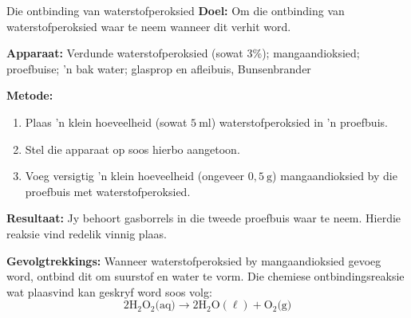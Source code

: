 \par
\label{m38709*secfhsst!!!underscore!!!id163}
            \begin{g_experiment}{Die ontbinding van waterstofperoksied}
            \nopagebreak
            \label{m38709*id63175}\noindent{}\textbf{Doel:}\newline
    Om die ontbinding van waterstofperoksied waar te neem wanneer dit verhit word. \par 
        \label{m38709*id63194}\noindent{}\textbf{Apparaat:}\newline
    Verdunde waterstofperoksied (sowat 3\%); mangaandioksied; proefbuise; 'n bak water; glasprop en afleibuis, Bunsenbrander\par 
        \label{m38709*eip-470}
	\par
      \label{m38709*id63199}
    \setcounter{subfigure}{0}
	\begin{figure}[H] %
    \begin{center}
    \end{center}
 \end{figure}       
        \par 
        \label{m38709*id63206}\noindent{}\textbf{Metode:}\label{m38709*id63212}\begin{enumerate}[noitemsep, label=\textbf{\arabic*}. ] 
            \label{m38709*uid11}\item Plaas 'n klein hoeveelheid (sowat $5~\text{ml}$) waterstofperoksied in 'n proefbuis.
\label{m38709*uid12}\item Stel die apparaat op soos hierbo aangetoon.
\label{m38709*uid13}\item Voeg versigtig 'n klein hoeveelheid (ongeveer $0,5~\text{g}$) mangaandioksied by die proefbuis met waterstofperoksied. 
\end{enumerate}
        \par 
        \label{m38709*id63254}\noindent{}\textbf{Resultaat:}\newline
    Jy behoort gasborrels in die tweede proefbuis waar te neem. Hierdie reaksie vind redelik vinnig plaas. \par 
        \label{m38709*id63302}\noindent{}\textbf{Gevolgtrekkings:}\newline
Wanneer waterstofperoksied by mangaandioksied gevoeg word, ontbind dit om suurstof en water te vorm.
Die chemiese ontbindingsreaksie wat plaasvind kan geskryf word soos volg:
        \label{m38709*id63313}\nopagebreak\noindent{}
    \begin{equation*}
    2{\text{H}}_{2}{\text{O}}_{2} \text{(aq)} \to 2\text{H}_{2}\text{O}(\ell)+{\text{O}}_{2}\text{(g)}
      \end{equation*}


\end{g_experiment}

